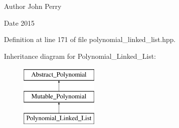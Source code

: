 \begin{DoxyAuthor}{Author}
John Perry 
\end{DoxyAuthor}
\begin{DoxyDate}{Date}
2015 
\end{DoxyDate}


Definition at line 171 of file polynomial\+\_\+linked\+\_\+list.\+hpp.

Inheritance diagram for Polynomial\+\_\+\+Linked\+\_\+\+List\+:\begin{figure}[H]
\begin{center}
\leavevmode
\includegraphics[height=3.000000cm]{group__polygroup}
\end{center}
\end{figure}
